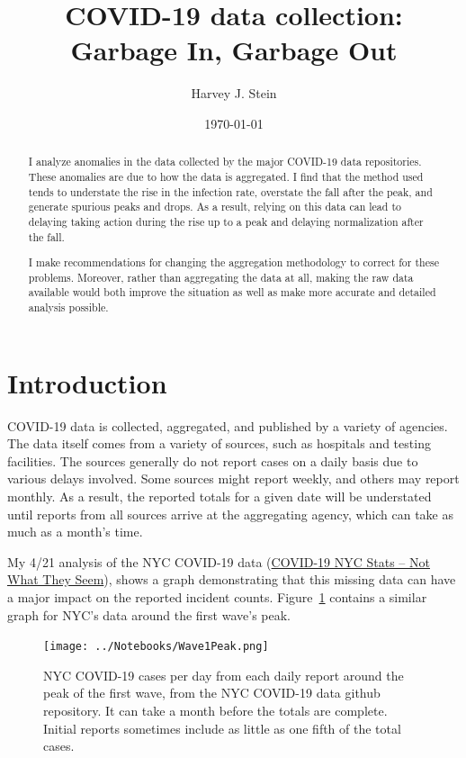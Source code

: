 \documentclass[10pt,reqno]{amsart}
\author{Harvey J. Stein}
\date{\today}
\begin{document}
\title{COVID-19 data collection: Garbage In, Garbage Out}

\begin{abstract}
  I analyze anomalies in the data collected by the major COVID-19 data
  repositories.  These anomalies are due to how the data is
  aggregated.  I find that the method used tends to understate the
  rise in the infection rate, overstate the fall after the peak, and
  generate spurious peaks and drops.  As a result, relying on this
  data can lead to delaying taking action during the rise up to a peak
  and delaying normalization after the fall.

  I make recommendations for changing the aggregation methodology to
  correct for these problems.  Moreover, rather than aggregating the
  data at all, making the raw data available would both improve the
  situation as well as make more accurate and detailed analysis
  possible.
\end{abstract}

\maketitle
\tableofcontents

\section{Introduction}
\label{sec:intro}
COVID-19 data is collected, aggregated, and published by a variety of
agencies.  The data itself comes from a variety of sources, such as
hospitals and testing facilities.  The sources generally do not report
cases on a daily basis due to various delays involved.  Some sources
might report weekly, and others may report monthly.  As a result, the
reported totals for a given date will be understated until reports
from all sources arrive at the aggregating agency, which can take
as much as a month's time.

My 4/21 analysis of the NYC COVID-19 data
(\href{https://hjstein.blogspot.com/2020/04/covid-19-nyc-stats-not-what-they-seem.html}{COVID-19 NYC Stats -- Not What They Seem}),
shows a graph demonstrating that this missing
data can have a major impact on the reported incident
counts.\nocite{nyc2020data,Stein2020nycdata,Stein2020owiddata,owid2020data}
Figure~\ref{fig:daily} contains a similar graph for NYC's data around
the first wave's peak.\nocite{Stein2020Seem}\nocite{Stein2020Ray}

\begin{figure}[!htb]
  \centering
  \texttt{[image: ../Notebooks/Wave1Peak.png]}
  \caption[NYC COVID-19 cases per day, each daily report, first
  peak]{NYC COVID-19 cases per day from each daily report around the
    peak of the first wave, from the NYC COVID-19 data github
    repository.  It can take a month before the totals are complete.
    Initial reports sometimes include as little as one fifth of the
    total cases.}
  \label{fig:daily}
\end{figure}
\end{document}
